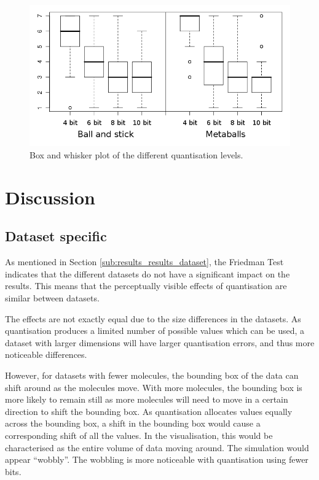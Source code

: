 \begin{figure}
  \begin{center}
    \includegraphics[width=120mm]{boxwhisker_all_both}
  \end{center}
  \caption{Box and whisker plot of the different quantisation levels.}
  \label{fig:results_boxwhisker_all}
\end{figure}



\section{Discussion}
\label{sec:results_discussion}

\subsection*{Dataset specific}
\label{sub:results_discussion_dataset}

As mentioned in Section \ref{sub:results_results_dataset}, the Friedman
Test indicates that the different datasets do not have a significant impact on
the results. This means that the perceptually visible effects of quantisation
are similar between datasets.

The effects are not exactly equal due to the size differences in the datasets.
As quantisation produces a limited number of possible values which can be used,
a dataset with larger dimensions will have larger quantisation errors, and thus
more noticeable differences.

However, for datasets with fewer molecules, the bounding box of the data can
shift around as the molecules move. With more molecules, the bounding box is
more likely to remain still as more molecules will need to move in a certain
direction to shift the bounding box. As quantisation allocates values equally
across the bounding box, a shift in the bounding box would cause a
corresponding shift of all the values. In the visualisation, this would be
characterised as the entire volume of data moving around. The simulation would
appear ``wobbly''. The wobbling is more noticeable with quantisation using
fewer bits.

